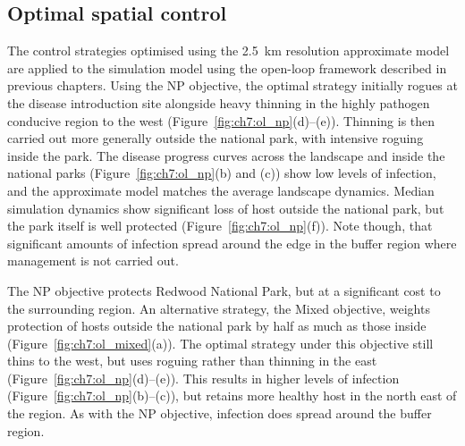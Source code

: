 \newpage
\subsection{Optimal spatial control}

The control strategies optimised using the \SI{2.5}{\km} resolution approximate model are applied to the simulation model using the open-loop framework described in previous chapters. Using the NP objective, the optimal strategy initially rogues at the disease introduction site alongside heavy thinning in the highly pathogen conducive region to the west (Figure~\ref{fig:ch7:ol_np}(d)--(e)). Thinning is then carried out more generally outside the national park, with intensive roguing inside the park. The disease progress curves across the landscape and inside the national parks (Figure~\ref{fig:ch7:ol_np}(b) and (c)) show low levels of infection, and the approximate model matches the average landscape dynamics. Median simulation dynamics show significant loss of host outside the national park, but the park itself is well protected (Figure~\ref{fig:ch7:ol_np}(f)). Note though, that significant amounts of infection spread around the edge in the buffer region where management is not carried out.

The NP objective protects Redwood National Park, but at a significant cost to the surrounding region. An alternative strategy, the Mixed objective, weights protection of hosts outside the national park by half as much as those inside (Figure~\ref{fig:ch7:ol_mixed}(a)). The optimal strategy under this objective still thins to the west, but uses roguing rather than thinning in the east (Figure~\ref{fig:ch7:ol_np}(d)--(e)). This results in higher levels of infection (Figure~\ref{fig:ch7:ol_np}(b)--(c)), but retains more healthy host in the north east of the region. As with the NP objective, infection does spread around the buffer region.

